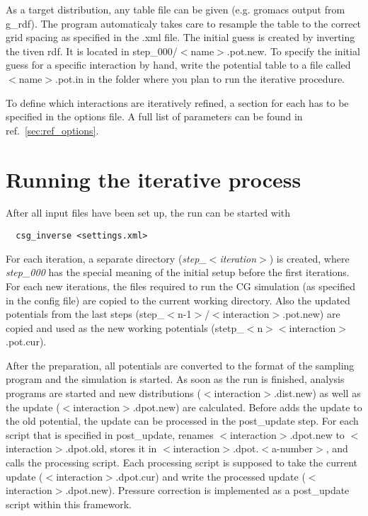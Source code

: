 As a target distribution, any table file can be given (e.g. gromacs output from g\_rdf). The program automaticaly takes care to resample the table to the correct grid spacing as specified in the .xml file.
The initial guess is created by inverting the tiven rdf. It is located in step\_000/$<$name$>$.pot.new. To specify the initial guess for a specific interaction by hand, write the potential table to a file called $<$name$>$.pot.in in the folder where you plan to run the iterative procedure.

To define which interactions are iteratively refined, a section for each has to be specified in the options file. A full list of parameters can be found in ref.~\ref{sec:ref_options}.

\section{Running the iterative process}
After all input files have been set up, the run can be started with
\begin{verbatim}
  csg_inverse <settings.xml>
\end{verbatim}

For each iteration, a separate directory (\textit{step\_$<$iteration$>$}) is created, where \textit{step\_000} has the special meaning of the initial setup before the first iterations. For each new iterations, the files required to run the CG simulation (as specified in the config file) are copied to the current working directory. Also the updated potentials from the last steps (step\_$<$n-1$>$/$<$interaction$>$.pot.new) are copied and used as the new working potentials (stetp\_$<$n$>$\/$<$interaction$>$.pot.cur).

After the preparation, all potentials are converted to the format of the sampling program and the simulation is started. As soon as the run is finished, analysis programs are started and new distributions ($<$interaction$>$.dist.new) as well as the update ($<$interaction$>$.dpot.new) are calculated. Before \votca adds the update to the old potential, the update can be processed in the post\_update step. For each script that is specified in post\_update, \votca renames $<$interaction$>$.dpot.new to $<$interaction$>$.dpot.old, stores it in $<$interaction$>$.dpot.$<$a-number$>$, and calls the processing script. Each processing script is supposed to take the current update ($<$interaction$>$.dpot.cur) and write the processed update ($<$interaction$>$.dpot.new). Pressure correction is implemented as a post\_update script within this framework.

